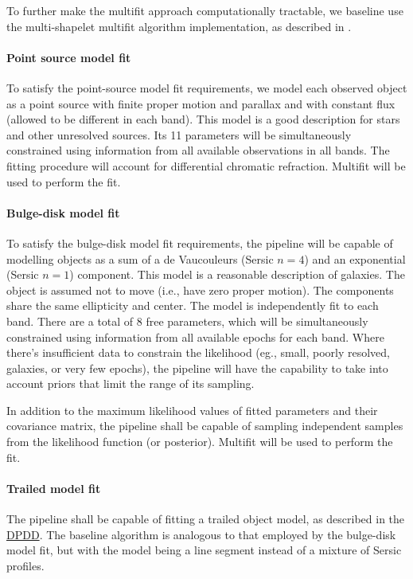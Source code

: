 \documentclass[12pt]{article}
\newcommand{\ds}[2]{{\color{blue} \href{https://docushare.lsstcorp.org/docushare/dsweb/Get/#1}{#2}}\xspace}
\newcommand{\DPDD}{\ds{LSE-163}{DPDD}}
\begin{document}
To further make the multifit approach computationally tractable, we baseline use the multi-shapelet multifit algorithm implementation, as described in \cite{Bosch13}.

\paragraph{Point source model fit} To satisfy the point-source model fit requirements, we model each observed object as a point source with finite proper motion and parallax and with constant flux (allowed to be different in each band). This model is a good description for stars and other unresolved sources. Its 11 parameters will be simultaneously constrained using information from all available observations in all bands. The fitting procedure will account for differential chromatic refraction. Multifit will be used to perform the fit.

\paragraph{Bulge-disk model fit} To satisfy the bulge-disk model fit requirements, the pipeline will be capable of modelling objects as a sum of a de Vaucouleurs (Sersic $n=4$) and an exponential (Sersic $n=1$) component. This model is a reasonable description of galaxies. The object is assumed not to move (i.e., have zero proper motion). The components share the same ellipticity and center. The model is independently fit to each band. There are a total of 8 free parameters, which will be simultaneously constrained using information from all available epochs for each band. Where there's insufficient data to constrain the likelihood (eg., small, poorly resolved, galaxies, or very few epochs), the pipeline will have the capability to take into account priors that limit the range of its sampling.

In addition to the maximum likelihood values of fitted parameters and their covariance matrix, the pipeline shall be capable of sampling independent samples from the likelihood function (or posterior). Multifit will be used to perform the fit.

\paragraph{Trailed model fit}

The pipeline shall be capable of fitting a trailed object model, as described in the \DPDD\@. The baseline algorithm is analogous to that employed by the bulge-disk model fit, but with the model being a line segment instead of a mixture of Sersic profiles.
\end{document}
